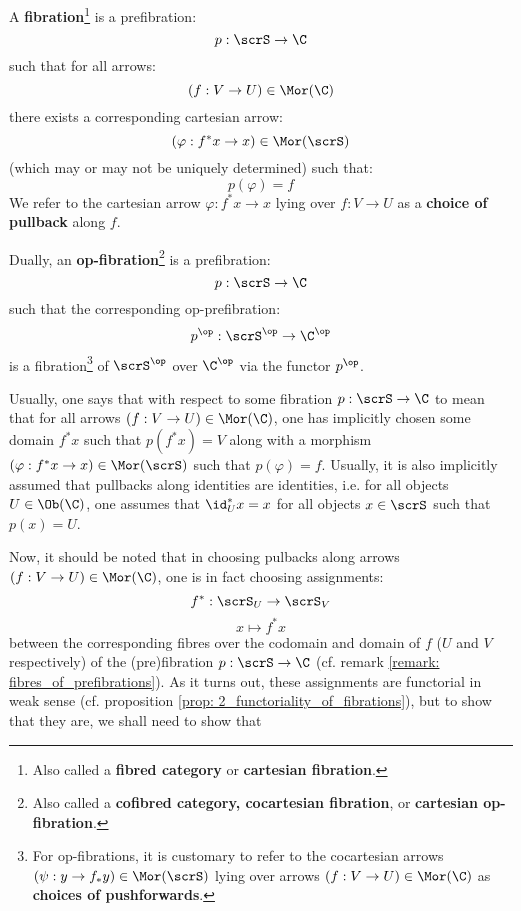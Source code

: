             \begin{definition}[(Op)fibrations] \label{def: (op)fibrations}
                A \textbf{fibration}\footnote{Also called a \textbf{fibred category} or \textbf{cartesian fibration}.} is a prefibration:
                    $$p: \scrS \to \C$$
                such that for all arrows:
                    $$(f: V \to U) \in \Mor(\C)$$
                there exists a corresponding cartesian arrow:
                    $$(\varphi: f^*x \to x) \in \Mor(\scrS)$$
                (which may or may not be uniquely determined) such that:
                    $$p(\varphi) = f$$
                We refer to the cartesian arrow $\varphi: f^*x \to x$ lying over $f: V \to U$ as a \textbf{choice of pullback} along $f$.
                
                Dually, an \textbf{op-fibration}\footnote{Also called a \textbf{cofibred category, cocartesian fibration}, or \textbf{cartesian op-fibration}.} is a prefibration:
                    $$p: \scrS \to \C$$
                such that the corresponding op-prefibration:
                    $$p^{\op}: \scrS^{\op} \to \C^{\op}$$
                is a fibration\footnote{For op-fibrations, it is customary to refer to the cocartesian arrows $(\psi: y \to f_*y) \in \Mor(\scrS)$ lying over arrows $(f: V \to U) \in \Mor(\C)$ as \textbf{choices of pushforwards}.} of $\scrS^{\op}$ over $\C^{\op}$ via the functor $p^{\op}$.
            \end{definition}
            \begin{remark}
                Usually, one says that  with respect to some fibration $p: \scrS \to \C$ to mean that for all arrows $(f: V \to U) \in \Mor(\C)$, one has implicitly chosen some domain $f^*x$ such that $p(f^*x) = V$ along with a morphism $(\varphi: f^*x \to x) \in \Mor(\scrS)$ such that $p(\varphi) = f$. Usually, it is also implicitly assumed that pullbacks along identities are identities, i.e. for all objects $U \in \Ob(\C)$, one assumes that $\id_U^*x = x$ for all objects $x \in \scrS$ such that $p(x) = U$.
                
                Now, it should be noted that in choosing pulbacks along arrows $(f: V \to U) \in \Mor(\C)$, one is in fact choosing assignments:
                    $$f^*: \scrS_U \to \scrS_V$$
                    $$x \mapsto f^*x$$
                between the corresponding fibres over the codomain and domain of $f$ ($U$ and $V$ respectively) of the (pre)fibration $p: \scrS \to \C$ (cf. remark \ref{remark: fibres_of_prefibrations}). As it turns out, these assignments are functorial in weak sense (cf. proposition \ref{prop: 2_functoriality_of_fibrations}), but to show that they are, we shall need to show that 
            \end{remark}
